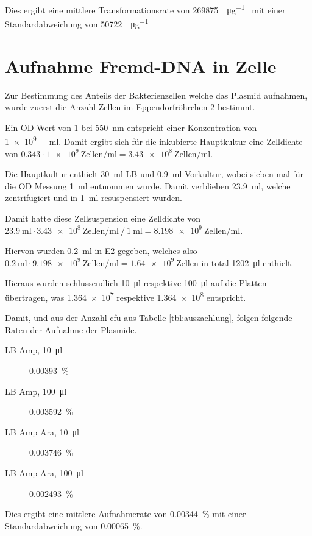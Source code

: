\documentclass[a4paper,english]{scrreprt}
\begin{document}
Dies ergibt eine mittlere Transformationsrate von \SI{269875}{\cfu \per \ug
{}} mit einer Standardabweichung von \SI{50722}{\cfu \per \ug
{}}

\section{Aufnahme Fremd-DNA in Zelle}

Zur Bestimmung des Anteils der Bakterienzellen welche das Plasmid aufnahmen,
wurde zuerst die Anzahl Zellen im Eppendorfröhrchen 2 bestimmt.

Ein OD Wert von 1 bei \SI{550}{\nm} entspricht einer Konzentration von
\SI{1e9}{ \per \ml}. Damit ergibt sich für die inkubierte
Hauptkultur eine Zelldichte von $0.343 \cdot \SI{1e9}{\text{Zellen} \per \ml}=
\SI{3.43e8}{\text{Zellen} \per \ml}$.

Die Hauptkultur enthielt \SI{30}{\ml} LB und \SI{0.9}{\ml} Vorkultur, wobei
sieben mal für die OD Messung \SI{1}{\ml} entnommen wurde. Damit verblieben
\SI{23.9}{\ml}, welche zentrifugiert und in \SI{1}{\ml} 
resuspensiert wurden.

Damit hatte diese Zellsuspension eine Zelldichte von $\SI{23.9}{\ml} \cdot
\SI{3.43e8}{\text{Zellen} \per \ml}\ /\ \SI{1}{\ml} =
\SI{8.198e9}{\text{Zellen}\per \ml}$.

Hiervon wurden \SI{0.2}{\ml} in E2 gegeben, welches also $\SI{0.2}{\ml} \cdot
\SI{9.198e9}{\text{Zellen}\per \ml} = \SI{1.64e9}{\text{Zellen}}$ in total
\SI{1202}{\ul} enthielt.

Hieraus wurden schlussendlich \SI{10}{\ul} respektive \SI{100}{\ul} auf die
Platten übertragen, was \SI{1.364e7}{} respektive
\SI{1.364e8}{} entspricht.

Damit, und aus der Anzahl cfu aus Tabelle \ref{tbl:auszaehlung}, folgen
folgende Raten der Aufnahme der Plasmide.

\begin{description}
	\item[LB Amp, \SI{10}{\ul}] \SI{0.00393}{\percent}
	\item[LB Amp, \SI{100}{\ul}] \SI{0.003592}{\percent}
	\item[LB Amp Ara, \SI{10}{\ul}] \SI{0.003746}{\percent}
	\item[LB Amp Ara, \SI{100}{\ul}] \SI{0.002493}{\percent}
\end{description}

Dies ergibt eine mittlere Aufnahmerate von \SI{0.00344}{\percent} mit einer
Standardabweichung von \SI{0.00065}{\percent}.



\end{document}
